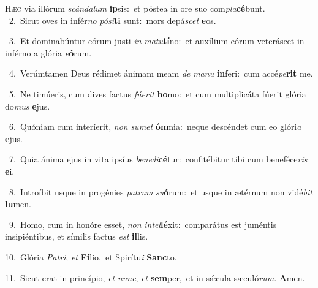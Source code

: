 \lettrine{\initial\textcolor{\initialcolor}{H}}{æc} via illórum \textit{scán}\-\textit{da}\textit{lum} \textbf{ip}\-sis:~\star et póstea in ore suo com\-\textit{pla}\-\textbf{cé}bunt.\\
{\numbfont\textcolor{\numbcolor}{~2.}}~Sicut oves in infér\textit{no} \textit{pó}\-\textit{si}\textbf{ti} sunt:~\star mors depá\textit{scet} \textbf{e}\-os.\par
{\numbfont\textcolor{\numbcolor}{~3.}}~Et dominabúntur eórum justi \textit{in} \textit{ma}\-\textit{tu}\textbf{tí}no:~\star et auxílium eórum veteráscet in inférno a glória \textit{e}\-\textbf{ó}rum.\par
{\numbfont\textcolor{\numbcolor}{~4.}}~Verúmtamen Deus rédimet ánimam meam \textit{de} \textit{ma}\-\textit{nu} \textbf{ín}\-feri:~\star cum accé\-\textit{pe}\-\textbf{rit} me.\par
{\numbfont\textcolor{\numbcolor}{~5.}}~Ne timúeris, cum dives factus \textit{fú}\-\textit{e}\textit{rit} \textbf{ho}\-mo:~\star et cum multiplicáta fúerit glória do\textit{mus} \textbf{e}\-jus.\par
{\numbfont\textcolor{\numbcolor}{~6.}}~Quóniam cum interíerit, \textit{non} \textit{su}\-\textit{met} \textbf{óm}\-nia:~\star neque descéndet cum eo glóri\textit{a} \textbf{e}\-jus.\par
{\numbfont\textcolor{\numbcolor}{~7.}}~Quia ánima ejus in vita ipsíus \textit{be}\-\textit{ne}\textit{di}\textbf{cé}tur:~\star confitébitur tibi cum beneféce\textit{ris} \textbf{e}\-i.\par
{\numbfont\textcolor{\numbcolor}{~8.}}~Introíbit usque in progénies \textit{pa}\-\textit{trum} \textit{su}\-\textbf{ó}rum:~\star et usque in ætérnum non vidé\textit{bit} \textbf{lu}\-men.\par
{\numbfont\textcolor{\numbcolor}{~9.}}~Homo, cum in honóre esset, \textit{non} \textit{in}\-\textit{tel}\textbf{lé}xit:~\star comparátus est juméntis insipiéntibus, et símilis factus \textit{est} \textbf{il}\-lis.\par
{\numbfont\textcolor{\numbcolor}{10.}}~Glória \textit{Pa}\-\textit{tri}, \textit{et} \textbf{Fí}\-lio,~\star et Spirítu\textit{i} \textbf{Sanc}\-to.\par
{\numbfont\textcolor{\numbcolor}{11.}}~Sicut erat in princípio, \textit{et} \textit{nunc}\-, \textit{et} \textbf{sem}\-per,~\star et in sǽcula sæculó\-\textit{rum}\-. \textbf{A}\-men.\par
